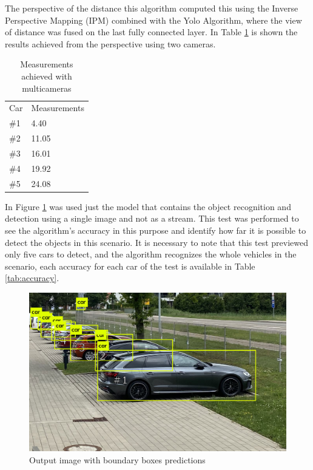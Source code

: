 The perspective of the distance this algorithm computed this using the Inverse Perspective Mapping (IPM) combined with the Yolo Algorithm, where the view of distance was fused on the last fully connected layer. In Table \ref{tab:output_framework} is shown the results achieved from the perspective using two cameras. 

\begin{table}[H]
\centering
\caption{Measurements achieved with multicameras}
\begin{tabular}{l|l} 
\toprule
Car &  Measurements      \\
\#1   & 4.40        \\
\#2   & 11.05       \\
\#3   & 16.01       \\
\#4   & 19.92       \\
\#5   & 24.08       \\
\bottomrule
\end{tabular}
\label{tab:output_framework}
\end{table} 
 

In Figure \ref{fig:park_predict} was used just the model that contains the object recognition and detection using a single image and not as a stream. This test was performed to see the algorithm's accuracy in this purpose and identify how far it is possible to detect the objects in this scenario. It is necessary to note that this test previewed only five cars to detect, and the algorithm recognizes the whole vehicles in the scenario, each accuracy for each car of the test is available in Table \ref{tab:accuracy}.


\begin{figure}[H]
\centering
\includegraphics[scale=0.3]{imagens/predictions.jpg}
\caption{Output image with boundary boxes predictions}
\label{fig:park_predict}
\end{figure}




